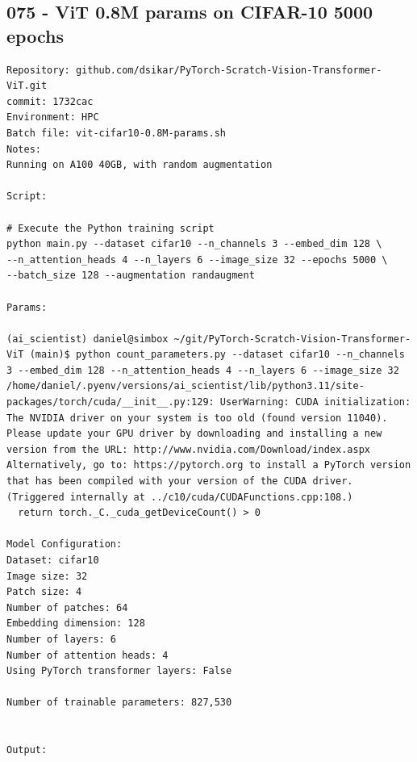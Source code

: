 \subsection{075 - ViT 0.8M params on CIFAR-10 5000 epochs}
\label{app_res:075}
\begin{verbatim}
Repository: github.com/dsikar/PyTorch-Scratch-Vision-Transformer-ViT.git
commit: 1732cac
Environment: HPC 
Batch file: vit-cifar10-0.8M-params.sh
Notes: 
Running on A100 40GB, with random augmentation

Script:

# Execute the Python training script
python main.py --dataset cifar10 --n_channels 3 --embed_dim 128 \
--n_attention_heads 4 --n_layers 6 --image_size 32 --epochs 5000 \
--batch_size 128 --augmentation randaugment

Params: 

(ai_scientist) daniel@simbox ~/git/PyTorch-Scratch-Vision-Transformer-ViT (main)$ python count_parameters.py --dataset cifar10 --n_channels 3 --embed_dim 128 --n_attention_heads 4 --n_layers 6 --image_size 32 
/home/daniel/.pyenv/versions/ai_scientist/lib/python3.11/site-packages/torch/cuda/__init__.py:129: UserWarning: CUDA initialization: The NVIDIA driver on your system is too old (found version 11040). Please update your GPU driver by downloading and installing a new version from the URL: http://www.nvidia.com/Download/index.aspx Alternatively, go to: https://pytorch.org to install a PyTorch version that has been compiled with your version of the CUDA driver. (Triggered internally at ../c10/cuda/CUDAFunctions.cpp:108.)
  return torch._C._cuda_getDeviceCount() > 0

Model Configuration:
Dataset: cifar10
Image size: 32
Patch size: 4
Number of patches: 64
Embedding dimension: 128
Number of layers: 6
Number of attention heads: 4
Using PyTorch transformer layers: False

Number of trainable parameters: 827,530


Output:



\end{verbatim}

